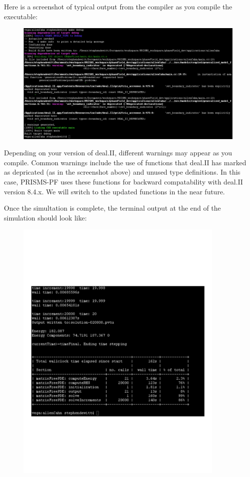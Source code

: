 \documentclass[10pt]{article} %
\begin{document}
Here is a screenshot of typical output from the compiler as you compile the executable:
\begin{figure}[H]
\vspace{0pt}
\hspace{-2cm}
\includegraphics[width=1.3\textwidth]{compile_output}
\vspace{0pt}
\end{figure}
Depending on your version of deal.II, different warnings may appear as you compile. Common warnings include the use of functions that deal.II has marked as depricated (as in the screenshot above) and unused type definitions. In this case, PRISMS-PF uses these functions for backward compatability with deal.II version 8.4.x. We will switch to the updated functions in the near future.

Once the simultation is complete, the terminal output at the end of the simulation should look like:
\begin{figure}[H]
\vspace{-60pt}
\centering
\includegraphics[width=0.9\textwidth]{allenCahn_output}
\vspace{-60pt}
\end{figure}
\end{document}
